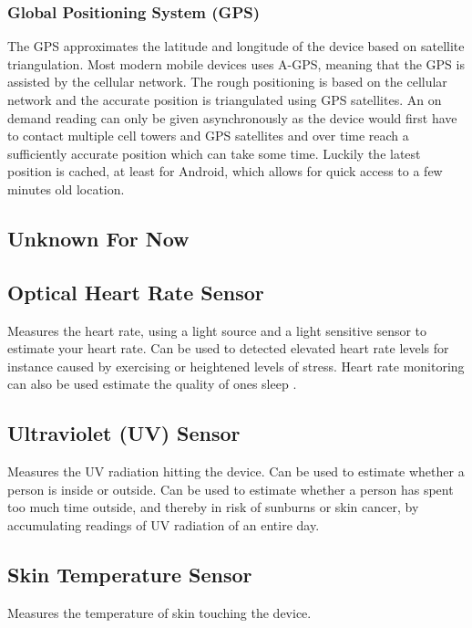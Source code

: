 \subsubsection{Global Positioning System (GPS)}
\label{sub:gps}
The GPS approximates the latitude and longitude of the device based on satellite triangulation. Most modern mobile devices uses A-GPS, meaning that the GPS is assisted by the cellular network. The rough positioning is based on the cellular network and the accurate position is triangulated using GPS satellites. An on demand reading can only be given asynchronously as the device would first have to contact multiple cell towers and GPS satellites and over time reach a sufficiently accurate position which can take some time. Luckily the latest position is cached, at least for Android, which allows for quick access to a few minutes old location. 

\subsection{Unknown For Now}
\label{sub:unknown_for_now}

\subsection{Optical Heart Rate Sensor}
\label{sub:optical_heart_rate_sensor}
Measures the heart rate, using a light source and a light sensitive sensor to estimate your heart rate. Can be used to detected elevated heart rate levels for instance caused by exercising or heightened levels of stress. Heart rate monitoring can also be used estimate the quality of ones sleep \parencite{guardian_fitness_tracker_rem_sleep}. 

\subsection{Ultraviolet (UV) Sensor}
\label{sub:uv_sensor}
Measures the UV radiation hitting the device. Can be used to estimate whether a person is inside or outside. Can be used to estimate whether a person has spent too much time outside, and thereby in risk of sunburns or skin cancer, by accumulating readings of UV radiation of an entire day.   

\subsection{Skin Temperature Sensor}
\label{sub:skin_temperature_sensor}
Measures the temperature of skin touching the device.  

